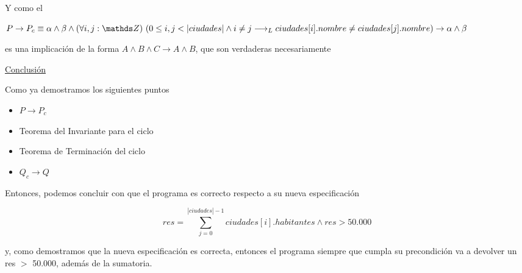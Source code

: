 \documentclass[10pt,a4paper]{article}
\begin{document}
\begin {enumerate}
    Y como el 
    
    $P \to P_{c} \equiv \alpha \land \beta \land \paraTodo[unalinea]{i, j}{\ent}{0 \leq i, j < |ciudades| \land i \neq j \implicaLuego ciudades[i].nombre \neq ciudades[j].nombre}  \to \alpha \land \beta$
    
    es una implicación de la forma $A \land B \land C \to A \land B$, que son verdaderas necesariamente

    \underline{Conclusión}

    Como ya demostramos los siguientes puntos
    \begin{itemize}
        \item $P \to P_{c}$
        \item Teorema del Invariante para el ciclo
        \item Teorema de Terminación del ciclo
        \item $Q_{c} \to Q$
    \end{itemize}
    
    Entonces, podemos concluir con que el programa es correcto respecto a su nueva especificación 
    
    $$res=\sum\limits_{j = 0}^{|ciudades| - 1}{ciudades[i].habitantes} \land res > 50.000$$

    y, como demostramos que la nueva especificación es  correcta, entonces el programa siempre que cumpla su precondición va a devolver un
    res $>$ 50.000, además de la sumatoria.



\end{enumerate}
\end{document}
